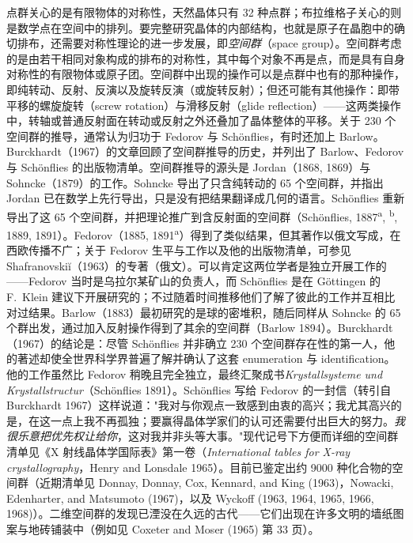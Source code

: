 点群关心的是有限物体的对称性，天然晶体只有 32 种点群；布拉维格子关心的则是数学点在空间中的排列。要完整研究晶体的内部结构，也就是原子在晶胞中的确切排布，还需要对称性理论的进一步发展，即\textit{空间群}（space group）。空间群考虑的是由若干相同对象构成的排布的对称性，其中每个对象不再是点，而是具有自身对称性的有限物体或原子团。空间群中出现的操作可以是点群中也有的那种操作，即纯转动、反射、反演以及旋转反演（或旋转反射）；但还可能有其他操作：即带平移的螺旋旋转（screw rotation）与滑移反射（glide reflection）——这两类操作中，转轴或普通反射面在转动或反射之外还叠加了晶体整体的平移。关于 230 个空间群的推导，通常认为归功于 Fedorov 与 Schönflies，有时还加上 Barlow。Burckhardt（1967）的文章回顾了空间群推导的历史，并列出了 Barlow、Fedorov 与 Schönflies 的出版物清单。空间群推导的源头是 Jordan（1868, 1869）与 Sohncke（1879）的工作。Sohncke 导出了只含纯转动的 65 个空间群，并指出 Jordan 已在数学上先行导出，只是没有把结果翻译成几何的语言。Schönflies 重新导出了这 65 个空间群，并把理论推广到含反射面的空间群（Schönflies, 1887\textsuperscript{a}, \textsuperscript{b}, 1889, 1891）。Fedorov（1885, 1891\textsuperscript{a}）得到了类似结果，但其著作以俄文写成，在西欧传播不广；关于 Fedorov 生平与工作以及他的出版物清单，可参见 Shafranovskiĭ（1963）的专著（俄文）。可以肯定这两位学者是独立开展工作的——Fedorov 当时是乌拉尔某矿山的负责人，而 Schönflies 是在 Göttingen 的 F.~Klein 建议下开展研究的；不过随着时间推移他们了解了彼此的工作并互相比对过结果。Barlow（1883）最初研究的是球的密堆积，随后同样从 Sohncke 的 65 个群出发，通过加入反射操作得到了其余的空间群（Barlow 1894）。Burckhardt（1967）的结论是：尽管 Schönflies 并非确立 230 个空间群存在性的第一人，他的著述却使全世界科学界普遍了解并确认了这套 enumeration 与 identification。他的工作虽然比 Fedorov 稍晚且完全独立，最终汇聚成书\textit{Krystallsysteme und Krystallstructur}（Schönflies 1891）。Schönflies 写给 Fedorov 的一封信（转引自 Burckhardt 1967）这样说道："我对与你观点一致感到由衷的高兴；我尤其高兴的是，在这一点上我不再孤独；要赢得晶体学家们的认可还需要付出巨大的努力。\textit{我很乐意把优先权让给你}，这对我并非头等大事。"现代记号下方便而详细的空间群清单见《X 射线晶体学国际表》第一卷（\textit{International tables for X-ray crystallography}，Henry and Lonsdale 1965）。目前已鉴定出约 9000 种化合物的空间群（近期清单见 Donnay, Donnay, Cox, Kennard, and King (1963)，Nowacki, Edenharter, and Matsumoto (1967)，以及 Wyckoff (1963, 1964, 1965, 1966, 1968)）。二维空间群的发现已湮没在久远的古代——它们出现在许多文明的墙纸图案与地砖铺装中（例如见 Coxeter and Moser (1965) 第 33 页）。

